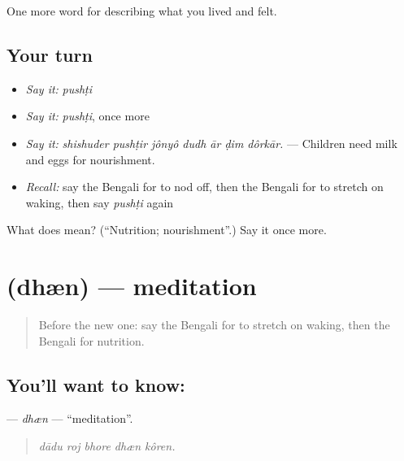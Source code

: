 \begin{grammarlens}[title={What you've built}]
One more word for describing what you lived and felt.
\end{grammarlens}

\subsection*{Your turn}
\begin{itemize}
\raggedright
  \item \emph{Say it:} \emph{pushṭi}
  \item \emph{Say it:} \emph{pushṭi}, once more
  \item \emph{Say it:} \emph{shishuder pushṭir jônyô dudh ār ḍim dôrkār.} — Children need milk and eggs for nourishment.
  \item \emph{Recall:} say the Bengali for to nod off, then the Bengali for to stretch on waking, then say \emph{pushṭi} again
\end{itemize}

\begin{tcolorbox}[breakable,colback=teal!4,colframe=teal!35!black,title={Before you move on}]
What does  mean? (\textquotedblleft{}Nutrition; nourishment\textquotedblright{}.) Say it once more.
\end{tcolorbox}
\section[\texorpdfstring{\bn{ধ্যান} (dhæn)}{ধ্যান (dhæn)}]{ (dhæn) — meditation}

\label{lesson:BN-C480-dhen}



\begin{quote}
Before the new one: say the Bengali for to stretch on waking, then the Bengali for nutrition.
\end{quote}

\subsection*{You'll want to know: }
\textbf{} — \emph{dhæn} — \textquotedblleft{}meditation\textquotedblright{}.

\begin{quote}
    
\end{quote}

\begin{quote}
\emph{dādu roj bhore dhæn kôren.}
\end{quote}

